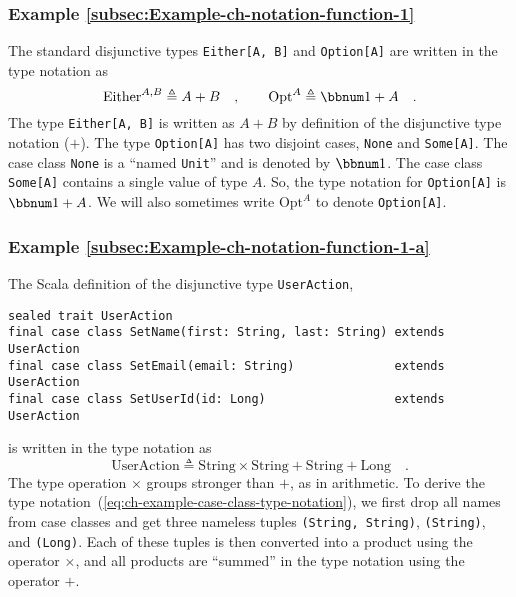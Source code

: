 \subsubsection{Example \label{subsec:Example-ch-notation-function-1}\ref{subsec:Example-ch-notation-function-1}}

The standard disjunctive types \lstinline!Either[A, B]! and \lstinline!Option[A]!
are written in the type notation as
\[
\text{Either}^{A,B}\triangleq A+B\quad,\quad\quad\text{Opt}^{A}\triangleq\bbnum 1+A\quad.
\]
The type \lstinline!Either[A, B]! is written as $A+B$ by definition
of the disjunctive type notation ($+$). The type \lstinline!Option[A]!
has two disjoint cases, \lstinline!None! and \lstinline!Some[A]!.
The case class \lstinline!None! is a \textsf{``}named
\lstinline!Unit!\textsf{''} and is denoted by $\bbnum 1$. The case class
\lstinline!Some[A]! contains a single value of type $A$. So, the
type notation for \lstinline!Option[A]! is $\bbnum 1+A$. We will
also sometimes write $\text{Opt}^{A}$ to denote \lstinline!Option[A]!.

\subsubsection{Example \label{subsec:Example-ch-notation-function-1-a}\ref{subsec:Example-ch-notation-function-1-a}}

The Scala definition of the disjunctive type \lstinline!UserAction!,
\begin{lstlisting}
sealed trait UserAction
final case class SetName(first: String, last: String) extends UserAction
final case class SetEmail(email: String)              extends UserAction
final case class SetUserId(id: Long)                  extends UserAction
\end{lstlisting}
is written in the type notation as
\begin{equation}
\text{UserAction}\triangleq\text{String}\times\text{String}+\text{String}+\text{Long}\quad.\label{eq:ch-example-case-class-type-notation}
\end{equation}
The type operation $\times$ groups stronger than $+$, as in arithmetic.
To derive the type notation~(\ref{eq:ch-example-case-class-type-notation}),
we first drop all names from case classes and get three nameless tuples
\lstinline!(String, String)!, \lstinline!(String)!, and \lstinline!(Long)!.
Each of these tuples is then converted into a product using the operator
$\times$, and all products are \textsf{``}summed\textsf{''} in the type notation
using the operator $+$.

